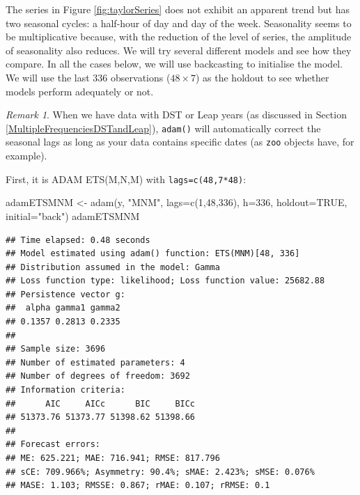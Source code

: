 \documentclass[
]{book}
\newenvironment{Shaded}{\begin{snugshade}}{\end{snugshade}}
\newcommand{\AttributeTok}[1]{\textcolor[rgb]{0.77,0.63,0.00}{#1}}
\newcommand{\ConstantTok}[1]{\textcolor[rgb]{0.00,0.00,0.00}{#1}}
\newcommand{\DecValTok}[1]{\textcolor[rgb]{0.00,0.00,0.81}{#1}}
\newcommand{\FunctionTok}[1]{\textcolor[rgb]{0.00,0.00,0.00}{#1}}
\newcommand{\NormalTok}[1]{#1}
\newcommand{\OtherTok}[1]{\textcolor[rgb]{0.56,0.35,0.01}{#1}}
\newcommand{\StringTok}[1]{\textcolor[rgb]{0.31,0.60,0.02}{#1}}
\theoremstyle{definition}
\theoremstyle{definition}
\theoremstyle{definition}
\theoremstyle{definition}
\theoremstyle{remark}
\newtheorem*{remark}{Remark}
\begin{document}
The series in Figure \ref{fig:taylorSeries} does not exhibit an apparent trend but has two seasonal cycles: a half-hour of day and day of the week. Seasonality seems to be multiplicative because, with the reduction of the level of series, the amplitude of seasonality also reduces. We will try several different models and see how they compare. In all the cases below, we will use backcasting to initialise the model. We will use the last 336 observations (\(48 \times 7\)) as the holdout to see whether models perform adequately or not.

\begin{remark}
When we have data with DST or Leap years (as discussed in Section \ref{MultipleFrequenciesDSTandLeap}), \texttt{adam()} will automatically correct the seasonal lags as long as your data contains specific dates (as \texttt{zoo} objects have, for example).
\end{remark}

First, it is ADAM ETS(M,N,M) with \texttt{lags=c(48,7*48)}:

\begin{Shaded}
\begin{Highlighting}[]
\NormalTok{adamETSMNM }\OtherTok{\textless{}{-}} \FunctionTok{adam}\NormalTok{(y, }\StringTok{"MNM"}\NormalTok{, }\AttributeTok{lags=}\FunctionTok{c}\NormalTok{(}\DecValTok{1}\NormalTok{,}\DecValTok{48}\NormalTok{,}\DecValTok{336}\NormalTok{),}
                   \AttributeTok{h=}\DecValTok{336}\NormalTok{, }\AttributeTok{holdout=}\ConstantTok{TRUE}\NormalTok{,}
                   \AttributeTok{initial=}\StringTok{"back"}\NormalTok{)}
\NormalTok{adamETSMNM}
\end{Highlighting}
\end{Shaded}

\begin{verbatim}
## Time elapsed: 0.48 seconds
## Model estimated using adam() function: ETS(MNM)[48, 336]
## Distribution assumed in the model: Gamma
## Loss function type: likelihood; Loss function value: 25682.88
## Persistence vector g:
##  alpha gamma1 gamma2 
## 0.1357 0.2813 0.2335 
## 
## Sample size: 3696
## Number of estimated parameters: 4
## Number of degrees of freedom: 3692
## Information criteria:
##      AIC     AICc      BIC     BICc 
## 51373.76 51373.77 51398.62 51398.66 
## 
## Forecast errors:
## ME: 625.221; MAE: 716.941; RMSE: 817.796
## sCE: 709.966%; Asymmetry: 90.4%; sMAE: 2.423%; sMSE: 0.076%
## MASE: 1.103; RMSSE: 0.867; rMAE: 0.107; rRMSE: 0.1
\end{verbatim}
\end{document}

